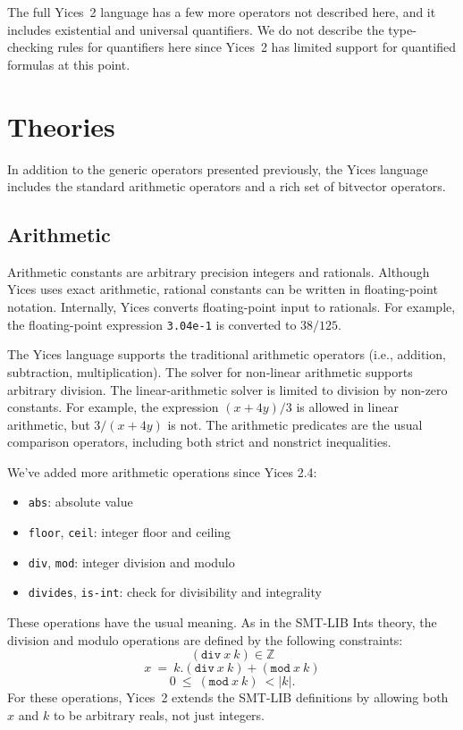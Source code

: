 \documentclass[11pt,twoside,fleqn,openright,titlepage]{cslreport}
\newcommand{\integers}{\ensuremath{\mathbb{Z}}}
\begin{document}
\medskip\noindent
The full Yices~2 language has a few more operators not described here,
and  it includes  existential  and universal  quantifiers.  We do  not
describe the  type-checking rules  for quantifiers here  since Yices~2
has limited support for quantified formulas at this point.


\section{Theories}

In addition  to the generic operators presented  previously, the Yices
language includes the standard arithmetic  operators and a rich set of
bitvector operators.

\subsection{Arithmetic}
\label{arithmetic-general}

Arithmetic constants  are arbitrary precision integers  and rationals.
Although  Yices  uses  exact  arithmetic, rational  constants  can  be
written  in  floating-point   notation.   Internally,  Yices  converts
floating-point input  to rationals.   For example,  the floating-point
expression \texttt{3.04e-1} is converted to $38/125$.

\medskip\noindent The Yices language supports the traditional
arithmetic operators (i.e., addition, subtraction, multiplication).
The solver for non-linear arithmetic supports arbitrary division. The
linear-arithmetic solver is limited to division by non-zero constants.
For example, the expression $(x + 4y)/3$ is allowed in linear
arithmetic, but $3/(x + 4y)$ is not. The arithmetic predicates are the
usual comparison operators, including both strict and nonstrict
inequalities.

\medskip\noindent
We've added more arithmetic operations since Yices 2.4:
\begin{itemize}
\item \texttt{abs}: absolute value
\item \texttt{floor}, \texttt{ceil}: integer floor and ceiling
\item \texttt{div}, \texttt{mod}: integer division and modulo
\item \texttt{divides}, \texttt{is-int}: check for divisibility and integrality
\end{itemize}
These operations have the usual meaning. As in the SMT-LIB Ints theory,
the division and modulo operations are defined by the following constraints:
$$(\mathtt{div}\ x\ k)\in \integers$$
$$x~=~k.(\mathtt{div}\ x\ k) + (\mathtt{mod}\ x\ k)$$
$$0~\leq~(\mathtt{mod}\ x\ k)~< |k|.$$ For these operations, Yices~2
extends the SMT-LIB definitions by allowing both $x$ and $k$ to be
arbitrary reals, not just integers.
\end{document}
